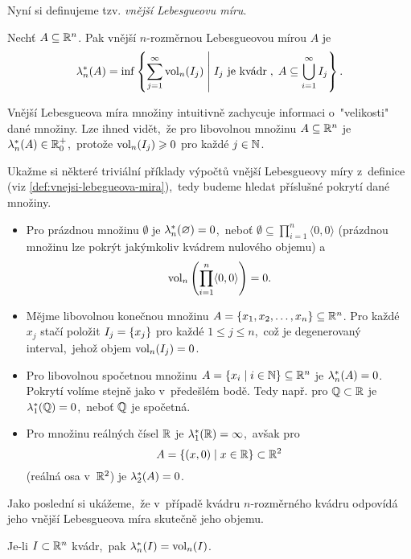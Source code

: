 Nyní si definujeme tzv. \emph{vnější Lebesgueovu míru}.
\begin{definition}\label{def:vnejsi-lebegueova-mira}
    Nechť $A\subseteq\mathbb{R}^n$. Pak vnější $n$-rozměr\-nou Lebesgueovou mírou $A$ je
    \[\lambda_n^*(A)=\inf\left\{\sum_{j=1}^{\infty}\operatorname{vol}_n(I_j)\;\middle|\;\text{$I_j$ je kvádr}\;,\;A\subseteq\bigcup_{i=1}^\infty I_j\right\}.\]
\end{definition}
Vnější Lebesgueova míra množiny intuitivně zachycuje informaci o~"velikosti" dané množiny.  Lze ihned vidět,~že pro libovolnou množinu $A\subseteq\mathbb{R}^n$ je $\lambda_n^*(A)\in\mathbb{R}_0^+$,~protože $\operatorname{vol}_n(I_j)\geqslant0$ pro každé $j\in\mathbb{N}$.
\begin{example}\label{ex:lebegueova-mira-trivialni-priklady}
    Ukažme si některé triviální příklady výpočtů vnější Lebesgueovy míry z~definice (viz \ref{def:vnejsi-lebegueova-mira}),~tedy budeme hledat příslušné pokrytí dané množiny.
    \begin{itemize}
        \item Pro prázdnou množinu $\emptyset$ je $\lambda_n^*(\varnothing)=0$,~neboť $\emptyset\subseteq\prod_{i=1}^{n}\langle0,0\rangle$ (prázdnou množinu lze pokrýt jakýmkoliv kvádrem nulového objemu) a
        \[\operatorname{vol}_n\left(\prod_{i=1}^{n}\langle0,0\rangle\right)=0.\]
        \item Mějme libovolnou konečnou množinu $A=\left\{x_1,x_2,\dots,x_n\right\}\subseteq\mathbb{R}^n$. Pro každé $x_j$ stačí položit $I_j=\left\{x_j\right\}$ pro každé $1\leqslant j\leqslant n$,~což je degenerovaný interval,~jehož objem $\operatorname{vol}_n(I_j)=0$.
        \item Pro libovolnou spočetnou množinu $A=\left\{x_i\mid i\in\mathbb{N}\right\}\subseteq\mathbb{R}^n$ je $\lambda_n^*(A)=0$. Pokrytí volíme stejně jako v~předešlém bodě. Tedy např. pro $\mathbb{Q}\subset\mathbb{R}$ je $\lambda_1^*(\mathbb{Q})=0$,~neboť $\mathbb{Q}$ je spočetná.
        \item Pro množinu reálných čísel $\mathbb{R}$ je $\lambda_1^*(\mathbb{R})=\infty$,~avšak pro 
        \[A=\left\{(x,0)\mid x\in\mathbb{R}\right\}\subset\mathbb{R}^2\]
        (reálná osa v~$\mathbb{R}^2$) je $\lambda_2^*(A)=0$.
    \end{itemize}
\end{example}
Jako poslední si ukážeme,~že v~případě kvádru $n$-rozměrného kvádru odpovídá jeho vnější Lebesgueova míra skutečně jeho objemu.
\begin{proposition}\label{prop:lebegueova-mira-objem-kvadru}
    Je-li $I\subset\mathbb{R}^n$ kvádr,~pak $\lambda_n^*(I)=\operatorname{vol}_n(I)$.
\end{proposition}
